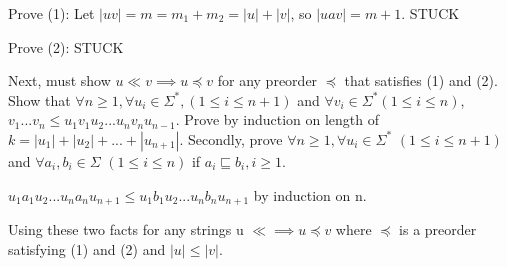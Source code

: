 \documentclass[12pt]{article}
\begin{document}
Prove (1): Let $|uv| = m = m_1 + m_2 = |u| + |v|$, so $|uav| = m+1$.
STUCK

\medskip

Prove (2): STUCK

Next, must show $u \ll v \implies u \preceq v$ for any preorder $ \preceq $ that satisfies (1) and (2).
Show that $\forall n \ge 1, \forall u_i \in \Sigma^\ast , (1 \le i \le n+1)$ and $ \forall v_i \in \Sigma^\ast (1 \le i \le n)$,
$v_1...v_n \le u_1v_1u_2...u_nv_nu_{n-1}$. Prove by induction on length of $k= |u_1|+|u_2|+ ... +|u_{n+1}|.$ Secondly, prove
$ \forall n \ge 1, \forall u_i \in \Sigma^\ast$ $(1 \le i \le n+1)$ and $\forall a_i,b_i \in \Sigma$ $(1 \le i \le n)$ if $a_i \sqsubseteq b_i, i \ge 1.$

\medskip

$u_1a_1u_2...u_na_nu_{n+1} \le u_1b_1u_2...u_nb_nu_{n+1}$ by induction on n.

\medskip

Using these two facts for any strings u $\ll \implies u \preceq v$ where $\preceq$ is a preorder satisfying (1) and (2) and $|u| \le |v|$.
\end{document}
